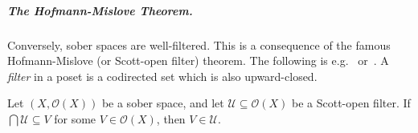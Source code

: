 \documentclass[%
  a4paper,
  UKenglish,
  cleveref,
  autoref,
  thm-restate,
  numberwithinsect,
]{lipics-v2021}
\newcommand\sle\subseteq
\newcommand\Open{\mathcal{O}}		%
\begin{document}
\subparagraph*{The Hofmann-Mislove Theorem.}
Conversely, sober spaces are well-filtered.
This is a consequence of the famous Hofmann-Mislove (or Scott-open filter)
theorem.
The following is e.g.~\cite[Theorem 8.3.2]{goubault13book}
or~\cite[Theorem 7.2.9]{aj95chapter}.
A \emph{filter} in a poset is a codirected set which is also upward-closed.

\begin{theorem}
\label{thm:proof:spectral:hofmann-mislove}
Let $(X, \Open(X))$ be a sober space,
and let $\mathcal{U} \sle \Open(X)$ be a Scott-open filter.
If $\bigcap \mathcal{U} \sle V$ for some $V \in \Open(X)$,
then $V \in \mathcal{U}$.
\end{theorem}
\end{document}
